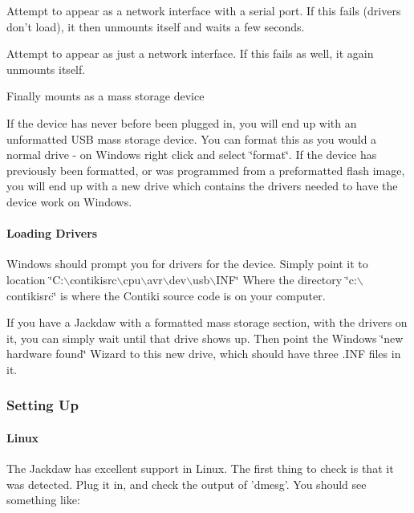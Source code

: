 \begin{DoxyItemize}
\item \-Attempt to appear as a network interface with a serial port. \-If this fails (drivers don't load), it then unmounts itself and waits a few seconds.
\item \-Attempt to appear as just a network interface. \-If this fails as well, it again unmounts itself.
\item \-Finally mounts as a mass storage device
\end{DoxyItemize}

\-If the device has never before been plugged in, you will end up with an unformatted \-U\-S\-B mass storage device. \-You can format this as you would a normal drive -\/ on \-Windows right click and select \char`\"{}format\char`\"{}. \-If the device has previously been formatted, or was programmed from a preformatted flash image, you will end up with a new drive which contains the drivers needed to have the device work on \-Windows.\hypertarget{a00053_loaddrivers}{}\paragraph{\-Loading Drivers}\label{a00053_loaddrivers}
\-Windows should prompt you for drivers for the device. \-Simply point it to location \char`\"{}\-C\-:$\backslash$contikisrc$\backslash$cpu$\backslash$avr$\backslash$dev$\backslash$usb$\backslash$\-I\-N\-F\char`\"{} \-Where the directory \char`\"{}c\-:$\backslash$contikisrc\char`\"{} is where the \-Contiki source code is on your computer.

\-If you have a \-Jackdaw with a formatted mass storage section, with the drivers on it, you can simply wait until that drive shows up. \-Then point the \-Windows \char`\"{}new hardware found\char`\"{} \-Wizard to this new drive, which should have three .\-I\-N\-F files in it.\hypertarget{a00053_setup}{}\subsubsection{\-Setting Up}\label{a00053_setup}
\hypertarget{a00053_Linux}{}\paragraph{\-Linux}\label{a00053_Linux}
\-The \-Jackdaw has excellent support in \-Linux. \-The first thing to check is that it was detected. \-Plug it in, and check the output of 'dmesg'. \-You should see something like\-:


